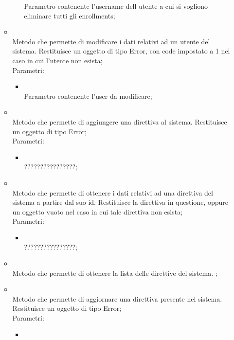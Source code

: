 \begin{itemize}
\begin{itemize}
\begin{itemize}
			Parametro contenente l'username dell utente a cui si vogliono eliminare tutti gli enrollments;
		\end{itemize}
		\item[]  \\
		Metodo che permette di modificare i dati relativi ad un utente del sistema. Restituisce un oggetto di tipo Error, con code impostato a 1 nel caso in cui l'utente non esista;\\
		Parametri:
		\begin{itemize}
			\item {} \\
			Parametro contenente l'user da modificare;
		\end{itemize}
		\item[]  \\
		Metodo che permette di aggiungere una direttiva al sistema. Restituisce un oggetto di tipo Error;\\
		Parametri:
		\begin{itemize}
			\item {} \\
			????????????????;
		\end{itemize}
		\item[]  \\
		Metodo che permette di ottenere i dati relativi ad una direttiva del sistema a partire dal suo id. Restituisce la direttiva in questione, oppure un oggetto vuoto nel caso in cui tale direttiva non esista;\\
		Parametri:
		\begin{itemize}
			\item {} \\
			????????????????;
		\end{itemize}
		\item[]  \\
		Metodo che permette di ottenere la lista delle direttive del sistema.
;\\
		\item[]  \\
		Metodo che permette di aggiornare una direttiva presente nel sistema. Restituisce un oggetto di tipo Error;\\
		Parametri:
		\begin{itemize}
			\item {} \\

\end{itemize}
\end{itemize}
\end{itemize}
